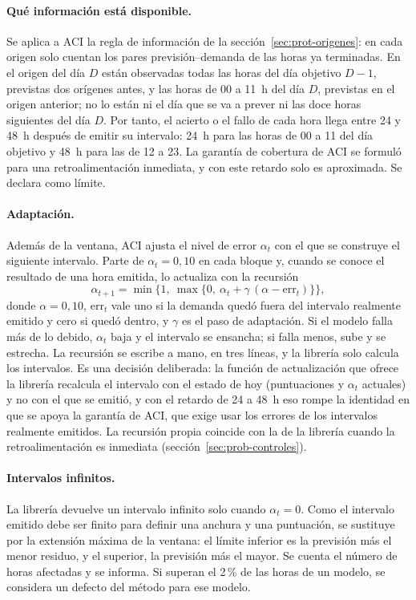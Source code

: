 \paragraph{Qué información está disponible.} Se aplica a ACI la regla de
información de la sección~\ref{sec:prot-origenes}: en cada origen solo cuentan
los pares previsión--demanda de las horas ya terminadas. En el origen del día
$D$ están observadas todas las horas del día objetivo $D-1$, previstas dos
orígenes antes, y las horas de 00 a 11~h del día $D$, previstas en el origen
anterior; no lo están ni el día que se va a prever ni las doce horas
siguientes del día $D$. Por tanto, el acierto o el fallo de cada hora llega
entre 24 y 48~h después de emitir su intervalo: 24~h para las horas de 00 a 11
del día objetivo y 48~h para las de 12 a 23. La garantía de cobertura de ACI
se formuló para una retroalimentación inmediata, y con este retardo solo es
aproximada. Se declara como límite.

\paragraph{Adaptación.} Además de la ventana, ACI ajusta el nivel de error
$\alpha_t$ con el que se construye el siguiente intervalo. Parte de $\alpha_t =
0{,}10$ en cada bloque y, cuando se conoce el resultado de una hora emitida, lo
actualiza con la recursión
\[
\alpha_{t+1} = \min\{1,\ \max\{0,\ \alpha_t + \gamma\,(\alpha - \mathrm{err}_t)\}\},
\]
donde $\alpha = 0{,}10$, $\mathrm{err}_t$ vale uno si la demanda quedó fuera del
intervalo realmente emitido y cero si quedó dentro, y $\gamma$ es el paso de
adaptación. Si el modelo falla más de lo debido, $\alpha_t$ baja y el
intervalo se ensancha; si falla menos, sube y se estrecha. La recursión se
escribe a mano, en tres líneas, y la librería solo calcula los intervalos. Es
una decisión deliberada: la función de actualización que ofrece la librería
recalcula el intervalo con el estado de hoy (puntuaciones y $\alpha_t$ actuales)
y no con el que se emitió, y con el retardo de 24 a 48~h eso rompe la identidad
en que se apoya la garantía de ACI, que exige usar los errores de los
intervalos realmente emitidos. La recursión propia coincide con la de la
librería cuando la retroalimentación es inmediata (sección~\ref{sec:prob-controles}).

\paragraph{Intervalos infinitos.} La librería devuelve un intervalo infinito
solo cuando $\alpha_t = 0$. Como el intervalo emitido debe ser finito para
definir una anchura y una puntuación, se sustituye por la extensión máxima de
la ventana: el límite inferior es la previsión más el menor residuo, y el
superior, la previsión más el mayor. Se cuenta el número de horas afectadas y
se informa. Si superan el 2\,\% de las horas de un modelo, se considera un
defecto del método para ese modelo.

